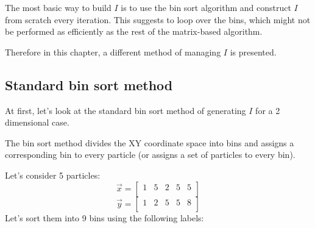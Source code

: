 \documentclass{article}
\begin{document}
The most basic way to build $I$ is to use the bin sort algorithm and construct $I$ from scratch every iteration. This suggests to loop over the bins, which might not be performed as efficiently as the rest of the matrix-based algorithm. 

Therefore in this chapter, a different method of managing $I$ is presented.
\subsection{Standard bin sort method}
At first, let's look at the standard bin sort method of generating $I$ for a 2 dimensional case.

The bin sort method divides the XY coordinate space into bins and assigns a corresponding bin to every particle (or assigns a set of particles to every bin).

Let's consider 5 particles:
$$
\Vec{x} = 
\begin{bmatrix}
1 & 5 & 2 & 5 & 5\\
\end{bmatrix}
$$
$$
\Vec{y} = 
\begin{bmatrix}
1 & 2 & 5 & 5 & 8\\
\end{bmatrix}
$$
Let's sort them into 9 bins using the following labels:

\end{document}
